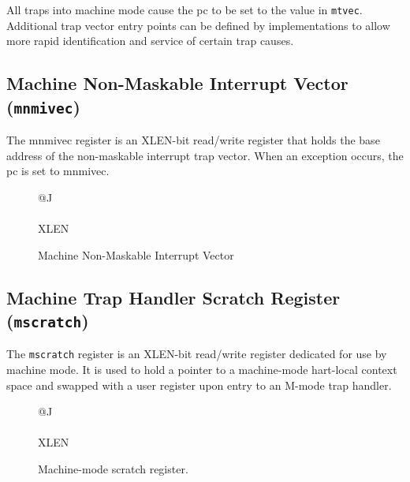 All traps into machine mode cause the pc to be set to the value in
\texttt{mtvec}. Additional trap vector entry points can be defined by
implementations to allow more rapid identification and service of
certain trap causes.

\subsection{Machine Non-Maskable Interrupt Vector
(\texttt{mnmivec})}\label{machine-non-maskable-interrupt-vector-mnmivec}

The mnmivec register is an XLEN-bit read/write register that holds the
base address of the non-maskable interrupt trap vector. When an
exception occurs, the pc is set to mnmivec.

\begin{figure}[h!]
	{\footnotesize
		\begin{center}
			\begin{tabular}{@{}J}
				 \\
				\hline
				 \\
				\hline
				XLEN \\
			\end{tabular}
		\end{center}
	}
	\vspace{-0.1in}
	\caption{Machine Non-Maskable Interrupt Vector}
	\label{fig:mnmivecreg}
\end{figure}



\subsection{Machine Trap Handler Scratch Register
({\tt mscratch})}\label{machine-trap-handler-scratch-register-mscratch}

The {\tt mscratch} register is an XLEN-bit read/write register dedicated for
use by machine mode. It is used to hold a pointer to a machine-mode
hart-local context space and swapped with a user register upon entry to
an M-mode trap handler.

\begin{figure}[h!]
	{\footnotesize
		\begin{center}
			\begin{tabular}{@{}J}
				\instbitrange{XLEN-1}{0} \\
				\hline
				\multicolumn{1}{|c|}{\tt mscratch} \\
				\hline
				XLEN \\
			\end{tabular}
		\end{center}
	}
	\vspace{-0.1in}
	\caption{Machine-mode scratch register.}
	\label{fig:mscratchreg}
\end{figure}

